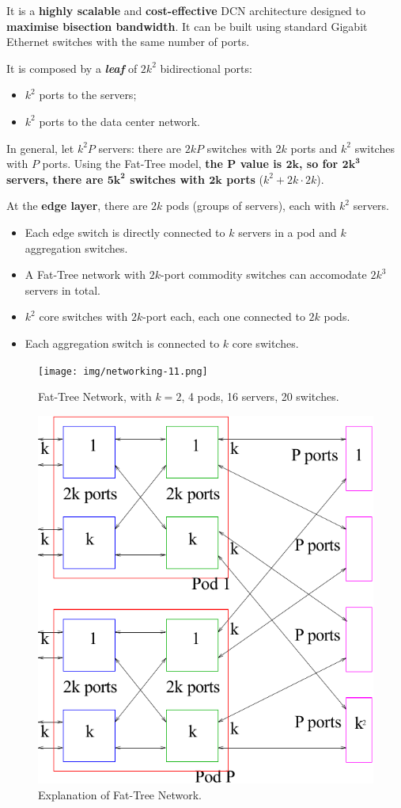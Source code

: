\highspace
It is a \textbf{highly scalable} and \textbf{cost-effective} DCN architecture designed to \textbf{maximise bisection bandwidth}. It can be built using standard Gigabit Ethernet switches with the same number of ports.

\highspace
It is composed by a \textbf{\emph{leaf}} of $2k^{2}$ bidirectional ports:
\begin{itemize}
    \item $k^{2}$ ports to the servers;
    \item $k^{2}$ ports to the data center network.
\end{itemize}
In general, let $k^{2}P$ servers: there are $2kP$ switches with $2k$ ports and $k^{2}$ switches with $P$ ports. Using the Fat-Tree model, \textbf{the $\mathbf{P}$ value is $\mathbf{2k}$, so for $\mathbf{2k^{3}}$ servers, there are $\mathbf{5k^{2}}$ switches with $\mathbf{2k}$ ports} ($k^{2} + 2k \cdot 2k$).

\highspace
At the \textbf{edge layer}, there are $2k$ pods (groups of servers), each with $k^{2}$ servers.
\begin{itemize}
    \item Each edge switch is directly connected to $k$ servers in a pod and $k$ aggregation switches. 
    \item A Fat-Tree network with $2k$-port commodity switches can accomodate $2k^{3}$ servers in total.
    \item $k^{2}$ core switches with $2k$-port each, each one connected to $2k$ pods.
    \item Each aggregation switch is connected to $k$ core switches.
\end{itemize}

\newpage

\begin{figure}[!htp]
    \centering
    \texttt{[image: img/networking-11.png]}
    \caption{Fat-Tree Network, with $k=2$, 4 pods, 16 servers, 20 switches.}
\end{figure}

\begin{figure}[!htp]
    \centering
    \includegraphics[width=.4\textwidth]{img/networking-10.pdf}
    \caption{Explanation of Fat-Tree Network.}
\end{figure}

